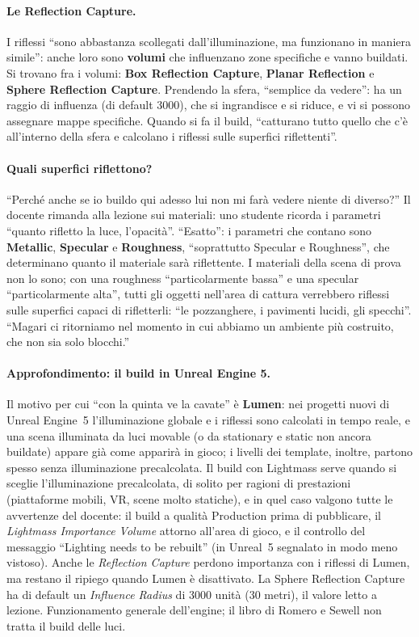 \paragraph{Le Reflection Capture.} I riflessi ``sono abbastanza scollegati
dall'illuminazione, ma funzionano in maniera simile'': anche loro sono \textbf{volumi} che
influenzano zone specifiche e vanno buildati. Si trovano fra i volumi: \textbf{Box
Reflection Capture}, \textbf{Planar Reflection} e \textbf{Sphere Reflection Capture}.
Prendendo la sfera, ``semplice da vedere'': ha un raggio di influenza (di default 3000), che
si ingrandisce e si riduce, e vi si possono assegnare mappe specifiche. Quando si fa il
build, ``catturano tutto quello che c'è all'interno della sfera e calcolano i riflessi sulle
superfici riflettenti''.

\paragraph{Quali superfici riflettono?} ``Perché anche se io buildo qui adesso lui non mi
farà vedere niente di diverso?'' Il docente rimanda alla lezione sui materiali: uno studente
ricorda i parametri ``quanto rifletto la luce, l'opacità''. ``Esatto'': i parametri che
contano sono \textbf{Metallic}, \textbf{Specular} e \textbf{Roughness}, ``soprattutto
Specular e Roughness'', che determinano quanto il materiale sarà riflettente. I materiali
della scena di prova non lo sono; con una roughness ``particolarmente bassa'' e una specular
``particolarmente alta'', tutti gli oggetti nell'area di cattura verrebbero riflessi sulle
superfici capaci di rifletterli: ``le pozzanghere, i pavimenti lucidi, gli specchi''. ``Magari
ci ritorniamo nel momento in cui abbiamo un ambiente più costruito, che non sia solo
blocchi.''

\paragraph{Approfondimento: il build in Unreal Engine 5.} Il motivo per cui ``con la quinta
ve la cavate'' è \textbf{Lumen}: nei progetti nuovi di Unreal Engine~5 l'illuminazione
globale e i riflessi sono calcolati in tempo reale, e una scena illuminata da luci movable
(o da stationary e static non ancora buildate) appare già come apparirà in gioco; i livelli
dei template, inoltre, partono spesso senza illuminazione precalcolata. Il build con
Lightmass serve quando si sceglie l'illuminazione precalcolata, di solito per ragioni di
prestazioni (piattaforme mobili, VR, scene molto statiche), e in quel caso valgono tutte le
avvertenze del docente: il build a qualità Production prima di pubblicare, il
\emph{Lightmass Importance Volume} attorno all'area di gioco, e il controllo del messaggio
``Lighting needs to be rebuilt'' (in Unreal~5 segnalato in modo meno vistoso). Anche le
\emph{Reflection Capture} perdono importanza con i riflessi di Lumen, ma restano il
ripiego quando Lumen è disattivato. La Sphere Reflection Capture ha di default un
\emph{Influence Radius} di 3000 unità (30 metri), il valore letto a lezione. Funzionamento
generale dell'engine; il libro di Romero e Sewell non tratta il build delle luci.

